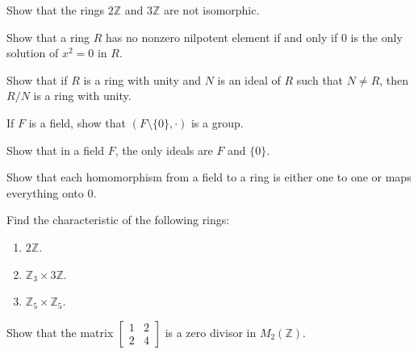 \begin{mdframed}
    \vspace{0.752cm}
    \begin{Exercise}
        Show that the rings $2\mathbb{Z}$ and $3\mathbb{Z}$ are not isomorphic.
    \end{Exercise}

    \vspace{0.752cm}
    \begin{Exercise}
        Show that a ring $R$ has no nonzero nilpotent element if and only if $0$ is the only solution of $x^2 = 0$ in $R$.
    \end{Exercise}

    \vspace{0.752cm}
    \begin{Exercise}
        Show that if $R$ is a ring with unity and $N$ is an ideal of $R$ such that $N \neq R$, then $R/N$ is a ring with unity.
    \end{Exercise}

    \vspace{0.752cm}
    \begin{Exercise}
        If $F$ is a field, show that $(F \setminus \{0\}, \cdot)$ is a group.
    \end{Exercise}

    \vspace{0.752cm}
    \begin{Exercise}
        Show that in a field $F$, the only ideals are $F$ and $\{ 0 \}$.
    \end{Exercise}

    \vspace{0.752cm}
    \begin{Exercise}
        Show that each homomorphism from a field to a ring is either one to one or maps everything onto 0. 
    \end{Exercise}

    \vspace{0.752cm}
    \begin{Exercise}
        Find the characteristic of the following rings:
        \begin{enumerate}
            \item $2 \mathbb{Z}$.
            \item $\mathbb{Z}_3 \times 3 \mathbb{Z}$.
            \item $\mathbb{Z}_5 \times \mathbb{Z}_5$.
        \end{enumerate} 
    \end{Exercise}

    \vspace{0.752cm}
    \begin{Exercise}
        Show that the matrix $\begin{bmatrix}
            1 & 2 \\ 2 & 4
        \end{bmatrix}$ is a zero divisor in $M_2(\mathbb{Z})$.
    \end{Exercise}


\end{mdframed}
